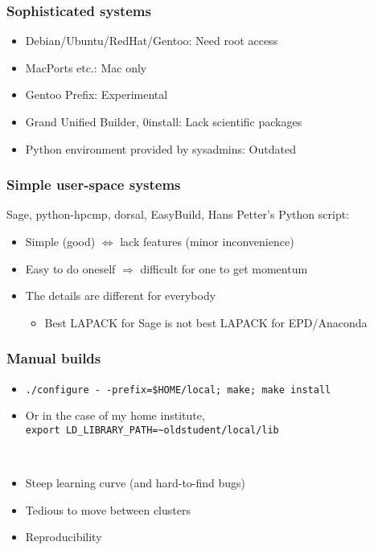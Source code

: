 \documentclass[sans,mathserif]{beamer}
\begin{document}
\begin{frame}
  \frametitle{Sophisticated systems}

  \begin{itemize}
  \item<+-> Debian/Ubuntu/RedHat/Gentoo: Need root access
  \item<+-> MacPorts etc.: Mac only
  \item<+-> Gentoo Prefix: Experimental
  \item<+-> Grand Unified Builder, 0install: Lack scientific packages
  \item<+-> Python environment provided by sysadmins: Outdated
  \end{itemize}

\end{frame}

\begin{frame}
  \frametitle{Simple user-space systems}
  Sage, python-hpcmp, dorsal, EasyBuild, Hans Petter's Python script:

  \begin{itemize}
  \item<+-> Simple (good) $\Leftrightarrow$ lack features (minor inconvenience)
  \item<+-> Easy to do oneself $\Rightarrow$ difficult for one to get
    momentum
  \item<+-> The details are different for everybody
   \begin{itemize}
    \item Best LAPACK for Sage is not best LAPACK for EPD/Anaconda
    \end{itemize}
  \end{itemize}
\end{frame}

\begin{frame}
  \frametitle{Manual builds}

  \begin{itemize}
  \item<+-> {\tt ./configure -\,{}-prefix=\$HOME/local; make; make install}
  \item<+->{Or in the case of my home institute,\\
{\tt export LD\_LIBRARY\_PATH=\textasciitilde{}oldstudent/local/lib}}
  \end{itemize}

~


\begin{itemize}
\item<+-> Steep learning curve (and hard-to-find bugs)
\item<+-> Tedious to move between clusters
\item<+-> Reproducibility 
\end{itemize}
\end{frame}
\end{document}
